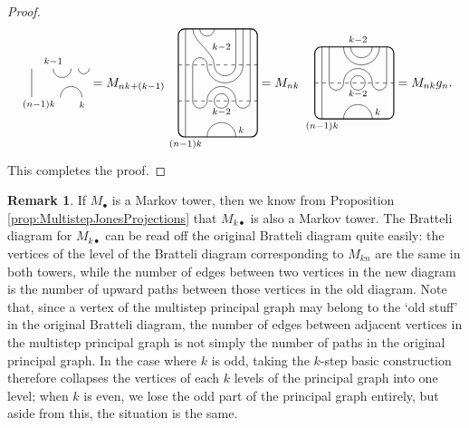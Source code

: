 \documentclass[11pt]{article}
\theoremstyle{plain}
\theoremstyle{definition}
\newtheorem{remark}[thm]{Remark}
\begin{document}
\begin{proof}
$$\begin{tikzpicture}[baseline = .3cm]
 \draw (.2,0) -- (.2,.8);
 \draw (.8,.8) arc (-180:0:.25cm);
 \draw (1.5,.8) arc (-180:0:.15cm);
 \draw (1,0) arc (180:0:.3cm);
 \node at (.8,1) {\scriptsize{$k{-}1$}};
 \node at (1.6,-.2) {\scriptsize{$k$}};
 \node at (.4,-.2) {\scriptsize{$(n{-}1)k$}};
\end{tikzpicture}
=
M_{nk+(k-1)}
\begin{tikzpicture}[baseline = 1.4cm]
 \draw[thick, rounded corners = 5pt] (0,0) rectangle (2.2,3);
 \draw (.2,0) -- (.2,3);
 \draw (.6,3) arc (-180:0:.2cm);
 \draw (.4,3) .. controls ++(270:.35cm) and ++(90:.35cm) .. (1,2) arc (-180:0:.3cm) -- (1.6,3);
 \draw (1.8,3) -- (1.8,2) arc (0:-180:.5cm) arc (0:180:.2cm) -- (.4,1) arc (-180:0:.2cm) arc (180:0:.4cm) arc (-180:0:.2cm) -- (2,3);
 \draw (1.2,1) circle (.2cm);
 \draw (.8,0) arc (180:0:.4cm);
 \draw[dashed] (0,1) -- (2.2,1);
 \draw[dashed] (0,2) -- (2.2,2);
 \node at (1.2,.7) {\scriptsize{$k{-}2$}};
 \node at (1.2,2.5) {\scriptsize{$k{-}2$}};
 \node at (1.75,.2) {\scriptsize{$k$}};
 \node at (.2,-.2) {\scriptsize{$(n{-}1)k$}};
\end{tikzpicture}
=
M_{nk}\,
\begin{tikzpicture}[baseline = .9cm]
 \draw[thick, rounded corners = 5pt] (0,0) rectangle (2.2,2);
 \draw (.2,0) -- (.2,2);
 \draw (1,2) arc (-180:0:.3cm);
 \draw (1.8,2) arc (0:-180:.5cm); 
 \draw (.4,2) -- (.4,1) arc (-180:0:.2cm) arc (180:0:.4cm) arc (-180:0:.2cm) -- (2,2);
 \draw (1.2,1) circle (.2cm);
 \draw (.8,0) arc (180:0:.4cm);
 \draw[dashed] (0,1) -- (2.2,1);
 \node at (1.2,.7) {\scriptsize{$k{-}2$}};
 \node at (1.2,2.2) {\scriptsize{$k{-}2$}};
 \node at (1.75,.2) {\scriptsize{$k$}};
 \node at (.2,-.2) {\scriptsize{$(n{-}1)k$}};
\end{tikzpicture}
=
M_{nk} g_n.
$$
This completes the proof.
\end{proof}



\begin{remark}
 \label{Rem:MultistepTowerEffects}
If $M_\bullet$ is a Markov tower, then we know from Proposition \ref{prop:MultistepJonesProjections} that 
$M_{k\bullet}$ is also a Markov tower. 
The Bratteli diagram for $M_{k\bullet}$ can be read off the original Bratteli diagram quite easily: the vertices of the level of the Bratteli diagram corresponding to $M_{kn}$ are the same in both towers, while the number of edges between two vertices in the new diagram is the number of upward paths between those vertices in the old diagram.
Note that, since a vertex of the multistep principal graph may belong to the `old stuff' in the original Bratteli diagram, the number of edges between adjacent vertices in the multistep principal graph is not simply the number of paths in the original principal graph.
In the case where $k$ is odd, taking the $k$-step basic construction therefore collapses the vertices of each $k$ levels of the principal graph into one level; when $k$ is even, we lose the odd part of the principal graph entirely, but aside from this, the situation is the same.
\end{remark}
\end{document}
